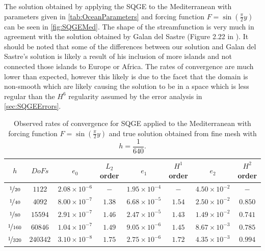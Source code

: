 The solution obtained by applying the SQGE to the Mediterranean with parameters
given in \autoref{tab:OceanParameters} and forcing function $F =
\sin(\frac{\pi}{2} y)$ can be seen in \autoref{fig:SQGEMed}. The shape of the
streamfunction is very much in agreement with the solution obtained by Galan del
Sastre (Figure 2.22 in \cite{Galan-del-Sastre2004}). It should be noted that
some of the differences between our solution and Galan del Sastre's solution is
likely a result of his inclusion of more islands and not connected those islands
to Europe or Africa. The rates of convergence are much lower than expected,
however this likely is due to the facet that the domain is non-smooth which are
likely causing the solution to be in a space which is less regular than the
$H^6$ regularity \cite{Soane2010} assumed by the error analysis in
\autoref{sec:SQGEErrors}.

\begin{table}
\begin{tabular}{|c|c|c|c|c|c|c|c|}%
  \hline
  $h$ & $DoFs$ & $e_0$ & $L_2$ order & $e_1$ & $H^1$ order & $e_2$ & $H^2$ order \\[0.2em]
  \hline
  $\nicefrac{1}{20}$ & $1122$ & $2.08\times 10^{-6}$ & $-$ & $1.95\times 10^{-4}$ & $-$ & $4.50\times 10^{-2}$ & $-$ \\
  $\nicefrac{1}{40}$ & $4092$ & $8.00\times 10^{-7}$ & $1.38$ & $6.68\times 10^{-5}$ & $1.54$ & $2.50\times 10^{-2}$ & $0.850$ \\
  $\nicefrac{1}{80}$ & $15594$ & $2.91\times 10^{-7}$ & $1.46$ & $2.47\times 10^{-5}$ & $1.43$ & $1.49\times 10^{-2}$ & $0.741$ \\
  $\nicefrac{1}{160}$ & $60846$ & $1.04\times 10^{-7}$ & $1.49$ & $9.05\times 10^{-6}$ & $1.45$ & $8.67\times 10^{-3}$ & $0.785$ \\
  $\nicefrac{1}{320}$ & $240342$ & $3.10\times 10^{-8}$ & $1.75$ & $2.75\times 10^{-6}$ & $1.72$ & $4.35\times 10^{-3}$ & $0.994$ \\
\hline
\end{tabular}
\caption{Observed rates of convergence for SQGE applied to the Mediterranean
  with forcing function $F = \sin(\frac{\pi}{2} y)$ and true solution obtained
  from fine mesh with $h=\dfrac{1}{640}$.}
  \label{tab:SQGEMedConvergence}
\end{table}

